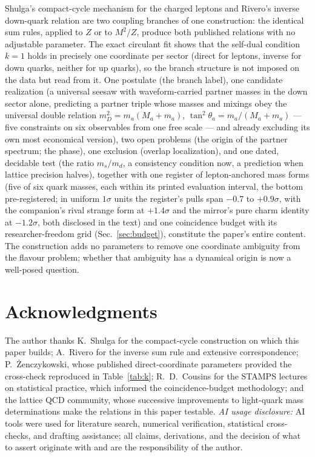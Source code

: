 \documentclass[11pt]{article}
\begin{document}
Shulga's compact-cycle mechanism for the charged leptons and Rivero's inverse
down-quark relation are two coupling branches of one construction: the identical
sum rules, applied to $Z$ or to $M^2/Z$, produce both published relations with no
adjustable parameter. The exact circulant fit shows that the self-dual condition
$k=1$ holds in precisely one coordinate per sector (direct for leptons, inverse
for down quarks, neither for up quarks), so the branch structure is not imposed
on the data but read from it. One postulate (the branch label), one candidate realization (a universal seesaw with waveform-carried partner masses in the down sector alone, predicting a partner triple whose masses and mixings obey the universal double relation $m_D^2 = m_a(M_a+m_a)$, $\tan^2\theta_a = m_a/(M_a+m_a)$ --- five constraints on six observables from one free scale --- and already
excluding its own most economical version), two open problems (the origin of the
partner spectrum; the phase), one exclusion (overlap localization), and one
dated, decidable test (the ratio $m_s/m_d$, a consistency condition now, a prediction when lattice precision halves), together with one register of lepton-anchored mass forms (five of six quark masses, each within its printed evaluation interval, the bottom pre-registered; in uniform $1\sigma$ units the register's pulls span $-0.7$ to $+0.9\sigma$, with the companion's rival strange form at $+1.4\sigma$ and the mirror's pure charm identity at $-1.2\sigma$, both disclosed in the text) and one coincidence budget with its researcher-freedom grid (Sec.~\ref{sec:budget}), constitute the paper's entire content. The
construction adds no parameters to remove one coordinate ambiguity from the
flavour problem; whether that ambiguity has a dynamical origin is now a
well-posed question.

\section*{Acknowledgments}
The author thanks K.~Shulga for the compact-cycle construction on which this paper
builds; A.~Rivero for the inverse sum rule and extensive correspondence;
P.~\.{Z}enczykowski, whose published direct-coordinate parameters provided the
cross-check reproduced in Table~\ref{tab:k}; R.~D.~Cousins for the STAMPS
lectures on statistical practice, which informed the coincidence-budget
methodology; and the lattice QCD community, whose successive improvements to
light-quark mass determinations make the relations in this paper testable.
\emph{AI usage disclosure:} AI tools were used for literature search, numerical verification, statistical cross-checks, and drafting assistance; all claims, derivations, and the decision of what to assert originate with and are the responsibility of the author.
\end{document}
